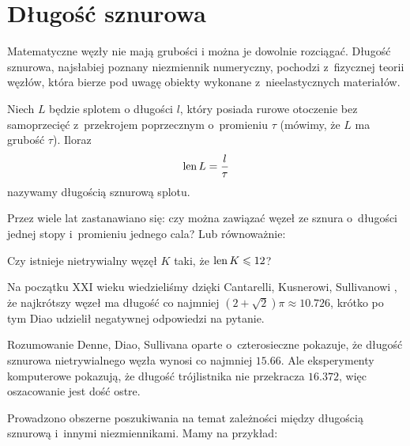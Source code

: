 
\section{Długość sznurowa}
%
Matematyczne węzły nie mają grubości i można je dowolnie rozciągać.
Długość sznurowa, najsłabiej poznany niezmiennik numeryczny, pochodzi z~fizycznej teorii węzłów, która bierze pod uwagę obiekty wykonane z~nieelastycznych materiałów.

\begin{definition}
    Niech $L$ będzie splotem o długości $l$, który posiada rurowe otoczenie bez samoprzecięć z~przekrojem poprzecznym o~promieniu $\tau$ (mówimy, że $L$ ma grubość $\tau$).
    Iloraz
    \begin{equation}
        \operatorname{len} L = \frac l \tau
    \end{equation}
    nazywamy długością sznurową splotu.
\end{definition}

Przez wiele lat zastanawiano się: czy można zawiązać węzeł ze sznura o~długości jednej stopy i~promieniu jednego cala?
Lub równoważnie:

\begin{conjecture}
    Czy istnieje nietrywialny węzęł $K$ taki, że $\operatorname{len} K \leqslant 12$?
\end{conjecture}

Na początku XXI wieku wiedzieliśmy dzięki Cantarelli, Kusnerowi, Sullivanowi \cite{cantarella2002}, że najkrótszy węzeł ma długość co najmniej $(2 + \sqrt 2)\pi \approx 10.726$, krótko po tym Diao \cite[s. 14]{diao2003} udzielił negatywnej odpowiedzi na pytanie.
%
%
%
%

\begin{example}
    Rozumowanie Denne, Diao, Sullivana \cite{denne2006} oparte o~czterosieczne pokazuje, że długość sznurowa nietrywialnego węzła wynosi co najmniej $15.66$.
Ale eksperymenty komputerowe pokazują, że długość trójlistnika nie przekracza $16.372$, więc oszacowanie jest dość ostre.
\end{example}

Prowadzono obszerne poszukiwania na temat zależności między długością sznurową i~innymi niezmiennikami.
Mamy na przykład:

